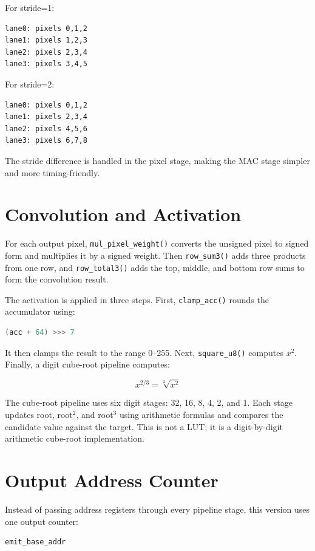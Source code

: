\documentclass[11pt]{article}
\begin{document}
For stride=1:

\begin{lstlisting}
lane0: pixels 0,1,2
lane1: pixels 1,2,3
lane2: pixels 2,3,4
lane3: pixels 3,4,5
\end{lstlisting}

For stride=2:

\begin{lstlisting}
lane0: pixels 0,1,2
lane1: pixels 2,3,4
lane2: pixels 4,5,6
lane3: pixels 6,7,8
\end{lstlisting}

The stride difference is handled in the pixel stage, making the MAC stage simpler and more timing-friendly.

\section*{Convolution and Activation}

For each output pixel, \texttt{mul\_pixel\_weight()} converts the unsigned pixel to signed form and multiplies it by a signed weight. Then \texttt{row\_sum3()} adds three products from one row, and \texttt{row\_total3()} adds the top, middle, and bottom row sums to form the convolution result.

The activation is applied in three steps. First, \texttt{clamp\_acc()} rounds the accumulator using:

\begin{lstlisting}[language=Verilog]
(acc + 64) >>> 7
\end{lstlisting}

It then clamps the result to the range 0--255. Next, \texttt{square\_u8()} computes $x^2$. Finally, a digit cube-root pipeline computes:

\[
x^{2/3} = \sqrt[3]{x^2}
\]

The cube-root pipeline uses six digit stages: 32, 16, 8, 4, 2, and 1. Each stage updates root, root$^2$, and root$^3$ using arithmetic formulas and compares the candidate value against the target. This is not a LUT; it is a digit-by-digit arithmetic cube-root implementation.

\section*{Output Address Counter}

Instead of passing address registers through every pipeline stage, this version uses one output counter:

\begin{lstlisting}[language=Verilog]
emit_base_addr
\end{lstlisting}
\end{document}
